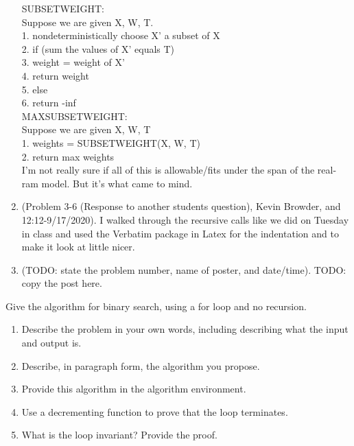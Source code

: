 \documentclass{article}
\begin{document}
\begin{enumerate}
        SUBSETWEIGHT: \\
        Suppose we are given X, W, T.\\
        1. nondeterministically choose X' a subset of X\\
        2. if (sum the values of X' equals T)\\
        3.     weight = weight of X'\\
        4.     return weight\\
        5. else\\
        6.     return -inf\\

        MAXSUBSETWEIGHT:\\
        Suppose we are given X, W, T\\
        1. weights = SUBSETWEIGHT(X, W, T)\\
        2. return max { weights }\\

        I'm not really sure if all of this is allowable/fits under the span of the real-ram model. But it's what came to mind.

    \item (Problem 3-6 (Response to another students question), Kevin Browder, and 12:12-9/17/2020). I walked through the recursive calls like we did on Tuesday in class and used the Verbatim package in Latex for the indentation and to make it look at little nicer.
    \item (TODO: state the problem number, name of poster, and date/time). TODO:
        copy the post here.
\end{enumerate}


\nextprob
{}

Give the algorithm for binary search, using a for loop and no recursion.

\begin{enumerate}
    \item Describe the problem in your own words, including describing what the input and output is.
    \item Describe, in paragraph form, the algorithm you propose.
    \item Provide this algorithm in the algorithm environment.
    \item Use a decrementing function to prove that the loop terminates.
    \item What is the loop invariant? Provide the proof.
\end{enumerate}
\end{document}
